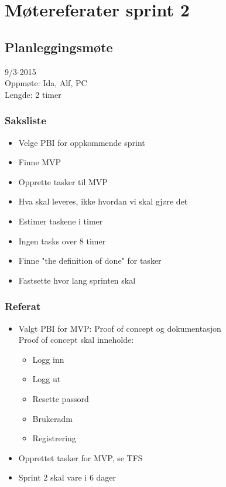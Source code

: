 \chapter{Møtereferater sprint 2}

\section{Planleggingsmøte}
\label{app:MotereferaterSprint2_planleggingsmote}
9/3-2015 
\\Oppmøte: Ida, Alf, PC
\\Lengde: 2 timer 
 
\subsection{Saksliste}
\begin{itemize}
\item Velge PBI for oppkommende sprint 
\item Finne MVP 
\item Opprette tasker til MVP  
\item Hva skal leveres, ikke hvordan vi skal gjøre det 
\item Estimer taskene i timer 
\item Ingen tasks over 8 timer 
\item Finne "the definition of done" for tasker 
\item Fastsette hvor lang sprinten skal 
\end{itemize}

\subsection{Referat}
\begin{itemize}
\item Valgt PBI for MVP: Proof of concept og dokumentasjon 
\\ Proof of concept skal inneholde: 
    \begin{itemize}
    \item Logg inn  
    \item Logg ut 
    \item Resette passord  
    \item Brukeradm 
    \item Registrering 
    \end{itemize}
\item Opprettet tasker for MVP, se TFS 
\item Sprint 2 skal vare i 6 dager 
\end{itemize}



